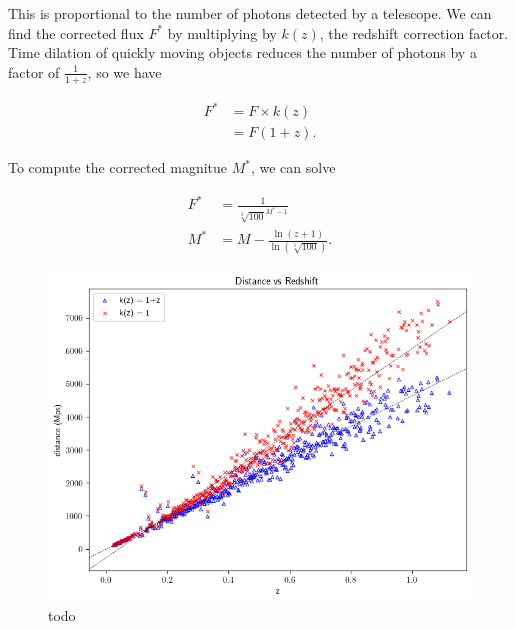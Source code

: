 \documentclass{article}
\begin{document}
This is proportional to the number of photons detected by a telescope. We can
find the corrected flux $F^*$ by multiplying by $k(z)$, the redshift correction factor. Time
dilation of quickly moving objects reduces the number of photons by a factor of
$\frac{1}{1 + z}$, so we have

\begin{equation}
\begin{aligned}
  F^* &= F \times k(z) \\
      &= F (1 + z).
\end{aligned}
\end{equation}

To compute the corrected magnitue $M^*$, we can solve

\begin{equation}
\begin{aligned}
   F^* &= \frac{1}{\sqrt[5]{100}^{M^* - 1}} \\
   M^* &= M - \frac{\ln{(z + 1)}}{\ln{(\sqrt[5]{100})}}.
\end{aligned}
\end{equation}














\begin{figure}[h!]
  \includegraphics[width=\linewidth]{../graphs/mu_distance_vs_redshift.png}
  \caption{todo}
  \label{fig:corrected_uncalibrated}
\end{figure}
\end{document}
